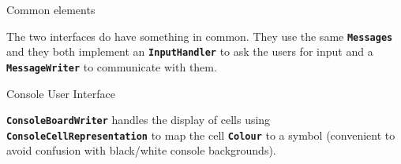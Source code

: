 \documentclass{beamer}
\begin{document}
  \begin{frame} {Common elements}

    The two interfaces do have something in common. They use the same \texttt{\textbf{Messages}} and they both implement an \textbf{\texttt{InputHandler}} to ask the users for input and a \textbf{\texttt{MessageWriter}} to communicate with them.

    \vspace{1em}

    \begin{centering}


    \end{centering}

  \end{frame}




  \begin{frame}{Console User Interface}

    \textbf{\texttt{ConsoleBoardWriter}} handles the display of cells using \textbf{\texttt{ConsoleCellRepresentation}} to map the cell \textbf{\texttt{Colour}} to a symbol (convenient to avoid confusion with black/white console backgrounds).

    \vspace{1em}

    \begin{centering}


    \end{centering}

  \end{frame}
\end{document}
